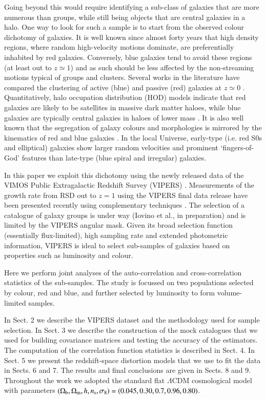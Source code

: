 \documentclass[longauth]{aa}
\begin{document}
Going beyond this would require identifying a sub-class of galaxies that are more numerous than groups, while still being objects that are central galaxies in a halo. One way to look for such a sample is to start from the observed colour dichotomy of galaxies. It is well known since almost forty years \citep[e.g.][]{dressler80} that  high density regions, where random high-velocity motions dominate, are preferentially inhabited by red galaxies. Conversely, blue galaxies tend to avoid these regions (at least out to $z\simeq 1$) and as such should be less affected by the non-streaming motions typical of groups and clusters.  Several works in the literature have compared the clustering of active (blue) and passive (red) galaxies at $z\simeq 0$ \citep{Madgwick03,zehavi05}. Quantitatively, halo occupation distribution (HOD) models indicate that red galaxies are likely to be satellites in massive dark matter haloes, while blue galaxies are typically central galaxies in haloes of lower mass \citep{guo14}. It is also well known that the segregation of galaxy colours and morphologies is mirrored by the kinematics of red and blue galaxies \citep{guzzo97}. In the local Universe, early-type (i.e. red S0s and elliptical) galaxies show larger random velocities and prominent `fingers-of-God' features than late-type (blue spiral and irregular) galaxies.  

In this paper we exploit this dichotomy using the newly released data of the VIMOS Public Extragalactic Redshift Survey (VIPERS) \citep{Guzzo14,Scodeggio16}.  Measurements of the growth rate from RSD out to $z=1$ using the VIPERS final data release have been presented recently using complementary techniques \citep{pezzotta16,delatorre16,hawken16}.  The selection of a catalogue of galaxy groups is under way (Iovino et al., in preparation) and is limited by the VIPERS angular mask. Given its broad selection function (essentially flux-limited), high sampling rate and extended photometric information, VIPERS is ideal to select sub-samples of galaxies based on properties such as  luminosity and colour. 

Here we perform joint analyses of the auto-correlation and cross-correlation statistics of the sub-samples.  The study is focussed on two populations selected by colour, red and blue, and further selected by luminosity to form volume-limited samples.

In Sect. 2 we describe the VIPERS dataset and the methodology used for sample selection. In Sect. 3 we describe the construction of the mock catalogues that we used for building covariance matrices and testing the accuracy of the estimators. The computation of the correlation function statistics is described in Sect. 4.  In Sect. 5 we present the redshift-space distortion models that we use to fit the data in Sects. 6 and 7.  The results and final conclusions are given in Sects. 8 and 9. Throughout the work we adopted the standard flat $\Lambda$CDM cosmological model with parameters $(\Omega_{\rm b},\Omega_{\rm m},h,n_{\rm s},\sigma_8)=(0.045,0.30,0.7,0.96,0.80)$.
\end{document}
